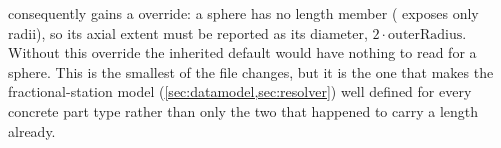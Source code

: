 consequently gains a  override: a sphere has no length
member ( exposes only radii), so its axial extent must be
reported as its diameter, $2\cdot\text{outerRadius}$. Without this override the inherited
default  would have nothing to read for a sphere. This is the smallest of
the file changes, but it is the one that makes the fractional-station model
(\cref{sec:datamodel,sec:resolver}) well defined for every concrete part type rather than only
the two that happened to carry a length already.
